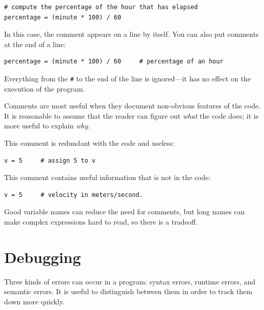 \documentclass[10pt]{book}
\begin{document}
\begin{verbatim}
# compute the percentage of the hour that has elapsed
percentage = (minute * 100) / 60
\end{verbatim}
%
In this case, the comment appears on a line by itself.  You can also put
comments at the end of a line:

\begin{verbatim}
percentage = (minute * 100) / 60     # percentage of an hour
\end{verbatim}
%
Everything from the {\tt \#} to the end of the line is ignored---it
has no effect on the execution of the program.

Comments are most useful when they document non-obvious features of
the code.  It is reasonable to assume that the reader can figure out
{\em what} the code does; it is more useful to explain {\em why}.

This comment is redundant with the code and useless:

\begin{verbatim}
v = 5     # assign 5 to v
\end{verbatim}
%
This comment contains useful information that is not in the code:

\begin{verbatim}
v = 5     # velocity in meters/second.
\end{verbatim}
%
Good variable names can reduce the need for comments, but
long names can make complex expressions hard to read, so there is
a tradeoff.


\section{Debugging}

Three kinds of errors can occur in a program: syntax errors, runtime
errors, and semantic errors.  It is useful
to distinguish between them in order to track them down more quickly.
\end{document}
